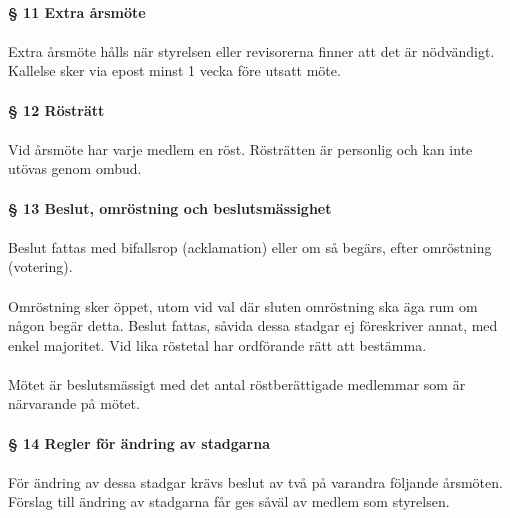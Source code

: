 \documentclass[12pt, a4paper]{article}
\begin{document}
\paragraph{§ 11 Extra årsmöte}
\paragraph{}
Extra årsmöte hålls när styrelsen eller revisorerna finner att det är nödvändigt. Kallelse sker via epost minst 1 vecka före utsatt möte.

\paragraph{§ 12 Rösträtt}
\paragraph{}
Vid årsmöte har varje medlem en röst. Rösträtten är personlig och kan inte utövas genom ombud.

\paragraph{§ 13 Beslut, omröstning och beslutsmässighet}
\paragraph{}
Beslut fattas med bifallsrop (acklamation) eller om så begärs, efter omröstning (votering).

\paragraph{}
Omröstning sker öppet, utom vid val där sluten omröstning ska äga rum om någon begär detta. Beslut fattas, såvida dessa stadgar ej föreskriver
annat, med enkel majoritet. Vid lika röstetal har ordförande rätt att bestämma.

\paragraph{}
Mötet är beslutsmässigt med det antal röstberättigade medlemmar som är närvarande på mötet.

\paragraph{§ 14 Regler för ändring av stadgarna}
\paragraph{}
För ändring av dessa stadgar krävs beslut av två på varandra följande årsmöten. Förslag till ändring av stadgarna får ges såväl av medlem som styrelsen.
\end{document}
